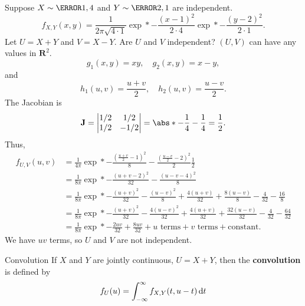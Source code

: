 \begin{Example}{}{}
    Suppose $ X \sim \N{1,4} $ and $ Y \sim \N{2,1} $ are independent.
    \[ f_{X,Y}(x,y)=
        \frac{1}{2\pi\sqrt{4\cdot 1}}\exp*{-\frac{(x-1)^2}{2\cdot 4}}
        \exp*{-\frac{(y-2)^2}{2\cdot 1}}. \]
    Let $ U=X+Y $ and $ V=X-Y $. Are $ U $ and $ V $ independent?
    $ (U,V) $ can have any values in $ \mathbf{R}^2 $.
    \[ g_1(x,y)=xy,\quad g_2(x,y)=x-y, \]
    and
    \[ h_1(u,v)=\frac{u+v}{2},\quad h_2(u,v)=\frac{u-v}{2}. \]
    The Jacobian is
    \[ \mathbf{J}=\begin{vmatrix}
            1/2 & 1/2  \\
            1/2 & -1/2
        \end{vmatrix}=\abs*{-\frac{1}{4}-\frac{1}{4}}=\frac{1}{2}. \]
    Thus,
    \begin{align*}
        f_{U,V}(u,v)
         & =\frac{1}{4\pi}\exp*{-\frac{(\frac{u+v}{2}-1)^2}{8}-
        \frac{(\frac{u-v}{2}-2)^2}{2}}\frac{1}{2}                                                              \\
         & =\frac{1}{8\pi}\exp*{-\frac{(u+v-2)^2}{32}-\frac{(u-v-4)^2}{8}}                                     \\
         & =\frac{1}{8\pi}\exp*{-\frac{(u+v)^2}{32}-\frac{(u-v)^2}{8}+
        \frac{4(u+v)}{32}+\frac{8(u-v)}{8}-\frac{4}{32}-\frac{16}{8}}                                          \\
         & =\frac{1}{8\pi}\exp*{-\frac{(u+v)^2}{32}-\frac{4(u-v)^2}{32}+
        \frac{4(u+v)}{32}+\frac{32(u-v)}{32}-\frac{4}{32}-\frac{64}{32}}                                       \\
         & =\frac{1}{8\pi}\exp*{-\frac{2uv}{32}+\frac{8uv}{32}+u\text{ terms}+v\text{ terms}+\text{constant}}.
    \end{align*}
    We have $ uv $ terms, so $ U $ and $ V $ are not independent.
\end{Example}
\begin{Definition}{Convolution}{}
    If $ X $ and $ Y $ are jointly continuous, $ U=X+Y $, then
    the \textbf{convolution} is defined by
    \[ f_U(u)=\int_{-\infty}^{\infty}f_{X,Y}(t,u-t)\odif{t} \]
\end{Definition}
